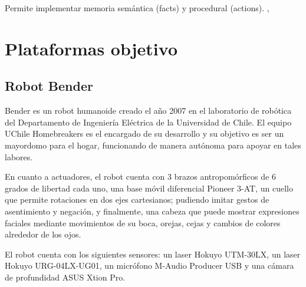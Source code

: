 Permite implementar memoria sem\'antica (facts) y procedural (actions).
\cite{Tenorth2013}, \cite{Tenorth2009}

%
%

%
%
%
%
%




\section{Plataformas objetivo}

\subsection{Robot Bender}

Bender es un robot humanoide creado el a\~no 2007 en el laboratorio de rob\'otica del Departamento de Ingenier\'ia El\'ectrica de la Universidad de Chile. El equipo UChile Homebreakers es el encargado de su desarrollo y  su objetivo es ser un mayordomo para el hogar, funcionando de manera aut\'onoma para apoyar en tales labores\cite{uchile-robotics}.


En cuanto a actuadores, el robot cuenta con 3 brazos antropom\'orficos de 6 grados de libertad cada uno, una base m\'ovil diferencial Pioneer 3-AT, un cuello que permite rotaciones en dos ejes cartesianos; pudiendo imitar gestos de asentimiento y negaci\'on, y finalmente, una cabeza que puede mostrar expresiones faciales mediante movimientos de su boca, orejas, cejas y cambios de colores alrededor de los ojos.

El robot cuenta con los siguientes sensores: un laser Hokuyo UTM-30LX, un laser Hokuyo URG-04LX-UG01, un micr\'ofono M-Audio Producer USB y una c\'amara de profundidad ASUS Xtion Pro.

